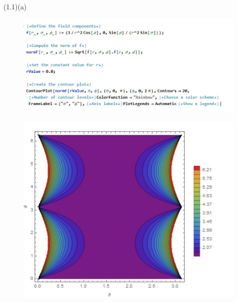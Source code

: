 \documentclass[journal,12pt,onecolumn]{IEEEtran}
\theoremstyle{remark}
\begin{document}
\solution \\
(1.1)(a)
\begin{figure}[H]
    \centering
     \includegraphics[scale=0.5]{figs/1.1.1.jpeg}
    \caption{}    
    \label{fig:ishitha.em.fig1}
\end{figure}
\begin{figure}[H]
    \centering
     \includegraphics[scale=0.5]{figs/1.1.2.jpeg}
    \caption{}    
    \label{fig:ishitha.em.fig1}
\end{figure}
\end{document}
